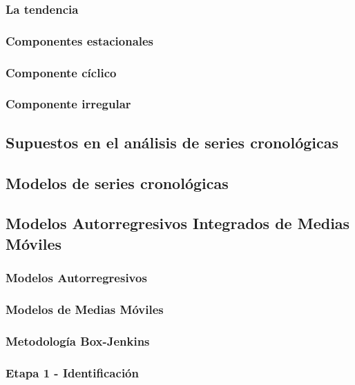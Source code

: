 \documentclass[
]{article}
\begin{document}
\subsubsection{La tendencia}

\subsubsection{Componentes estacionales}

\subsubsection{Componente cíclico}

\subsubsection{Componente irregular}

\subsection{Supuestos en el análisis de series cronológicas}

\subsection{Modelos de series cronológicas}

\subsection{Modelos Autorregresivos Integrados de Medias Móviles}

\subsubsection{Modelos Autorregresivos}

\subsubsection{Modelos de Medias Móviles}

\subsubsection{Metodología Box-Jenkins}

\subsubsection{Etapa 1 - Identificación}
\end{document}
